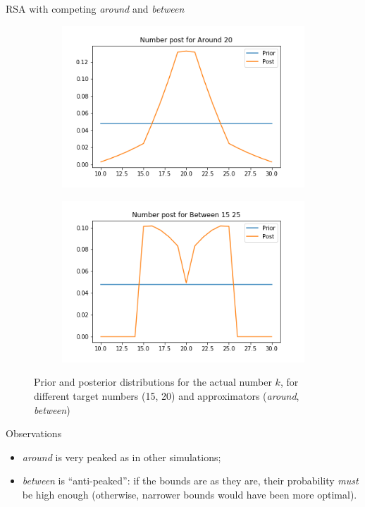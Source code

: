\documentclass[xcolor=table, hyperref={pdfpagelabels=false}]{beamer}
\begin{document}
\begin{frame}{RSA with competing \textit{around} and \textit{between}}
\begin{minipage}{.6\textwidth}
\begin{figure}[H]
	\begin{subfigure}[b]{0.45\textwidth}
		\includegraphics[width=\textwidth]{./images/number_post_around_20_between.png}
	\end{subfigure}
	\quad
	\begin{subfigure}[b]{0.45\textwidth}
		\includegraphics[width=\textwidth]{./images/number_post_between_15_25.png}
	\end{subfigure}
	
	\caption{Prior and posterior distributions for the actual number $k$, for different target numbers (15, 20) and approximators (\textit{around}, \textit{between})}
	\label{fig:rsa_approx_between}
\end{figure}
\end{minipage}
\begin{minipage}{.35\textwidth}
	\begin{block}{Observations}
		\begin{itemize}
			\item \textit{around} is very peaked as in other simulations;
			\item \textit{between} is ``anti-peaked'': if the bounds are as they are, their probability \textit{must} be high enough (otherwise, narrower bounds would have been more optimal).
		\end{itemize}
	\end{block}
\end{minipage}
\end{frame}
\end{document}
